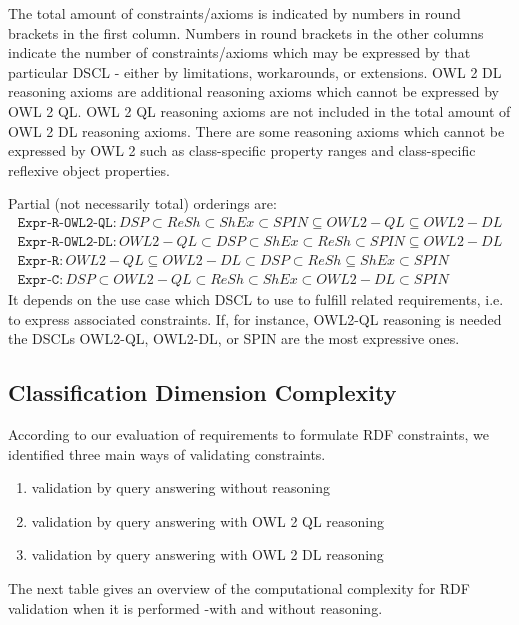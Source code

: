 \documentclass{llncs}
\newcommand{\ms}[1]{\texttt{#1}}
\begin{document}
The total amount of constraints/axioms is indicated by numbers in round brackets in the first column.
Numbers in round brackets in the other columns indicate the number of constraints/axioms which may be expressed by that particular DSCL - either by limitations, workarounds, or extensions.  
OWL 2 DL reasoning axioms are additional reasoning axioms which cannot be expressed by OWL 2 QL. 
OWL 2 QL reasoning axioms are not included in the total amount of OWL 2 DL reasoning axioms.
There are some reasoning axioms which cannot be expressed by OWL 2 such as class-specific property ranges and class-specific reflexive object properties.

Partial (not necessarily total) orderings are:
\begin{eqnarray*}
\ms{Expr-R-OWL2-QL}: DSP \subset ReSh \subset ShEx \subset SPIN \subseteq OWL2-QL \subseteq OWL2-DL \\
\ms{Expr-R-OWL2-DL}: OWL2-QL \subset DSP \subset ShEx \subset ReSh \subset SPIN \subseteq OWL2-DL \\
\ms{Expr-R}: OWL2-QL \subseteq OWL2-DL \subset DSP \subset ReSh \subseteq ShEx \subset SPIN \\
\ms{Expr-C}: DSP \subset OWL2-QL \subset ReSh \subset ShEx \subset OWL2-DL \subset SPIN
\end{eqnarray*}
It depends on the use case which DSCL to use to fulfill related requirements, i.e. to express associated constraints.
If, for instance, OWL2-QL reasoning is needed the DSCLs OWL2-QL, OWL2-DL, or SPIN are the most expressive ones.

\subsection{Classification Dimension Complexity}

According to our evaluation of requirements to formulate RDF constraints, we identified three main ways of validating constraints.

\begin{enumerate}
	\item validation by query answering without reasoning
	\item validation by query answering with OWL 2 QL reasoning
	\item validation by query answering with OWL 2 DL reasoning
\end{enumerate}

The next table gives an overview of the computational complexity for RDF validation when it is performed -with and without reasoning. 
\end{document}

